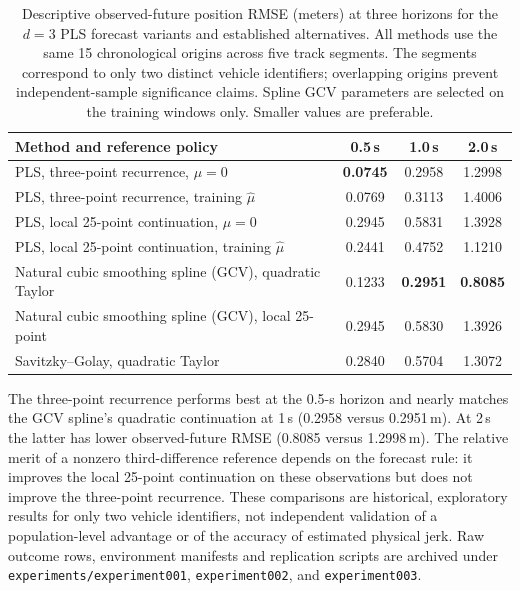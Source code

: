 \begin{table}[t]
\centering
\caption{Descriptive observed-future position RMSE (meters) at three horizons for the $d=3$ PLS forecast variants and established alternatives. All methods use the same 15 chronological origins across five track segments. The segments correspond to only two distinct vehicle identifiers; overlapping origins prevent independent-sample significance claims. Spline GCV parameters are selected on the training windows only. Smaller values are preferable.}
\label{tab:d3-forecast-comparison}
\begin{tabular}{lccc}
\toprule
Method and reference policy & 0.5\,s & 1.0\,s & 2.0\,s\\
\midrule
PLS, three-point recurrence, $\mu=0$ & \textbf{0.0745} & 0.2958 & 1.2998\\
PLS, three-point recurrence, training $\widehat\mu$ & 0.0769 & 0.3113 & 1.4006\\
PLS, local 25-point continuation, $\mu=0$ & 0.2945 & 0.5831 & 1.3928\\
PLS, local 25-point continuation, training $\widehat\mu$ & 0.2441 & 0.4752 & 1.1210\\
Natural cubic smoothing spline (GCV), quadratic Taylor & 0.1233 & \textbf{0.2951} & \textbf{0.8085}\\
Natural cubic smoothing spline (GCV), local 25-point & 0.2945 & 0.5830 & 1.3926\\
Savitzky--Golay, quadratic Taylor & 0.2840 & 0.5704 & 1.3072\\
\bottomrule
\end{tabular}
\end{table}

The three-point recurrence performs best at the 0.5-s horizon and nearly matches the GCV spline's quadratic continuation at 1\,s (0.2958 versus 0.2951\,m). At 2\,s the latter has lower observed-future RMSE (0.8085 versus 1.2998\,m). The relative merit of a nonzero third-difference reference depends on the forecast rule: it improves the local 25-point continuation on these observations but does not improve the three-point recurrence. These comparisons are historical, exploratory results for only two vehicle identifiers, not independent validation of a population-level advantage or of the accuracy of estimated physical jerk. Raw outcome rows, environment manifests and replication scripts are archived under \texttt{experiments/experiment001}, \texttt{experiment002}, and \texttt{experiment003}.

